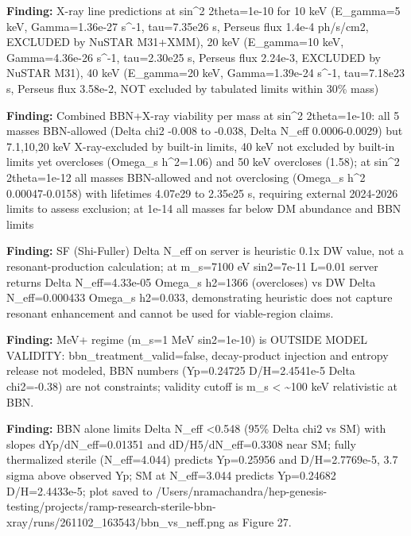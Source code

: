 \documentclass[11pt,a4paper]{article}
\begin{document}
\textbf{Finding:} X-ray line predictions at sin\textasciicircum{}2 2theta=1e-10 for 10 keV (E\_gamma=5 keV, Gamma=1.36e-27 s\textasciicircum{}-1, tau=7.35e26 s, Perseus flux 1.4e-4 ph/s/cm2, EXCLUDED by NuSTAR M31+XMM), 20 keV (E\_gamma=10 keV, Gamma=4.36e-26 s\textasciicircum{}-1, tau=2.30e25 s, Perseus flux 2.24e-3, EXCLUDED by NuSTAR M31), 40 keV (E\_gamma=20 keV, Gamma=1.39e-24 s\textasciicircum{}-1, tau=7.18e23 s, Perseus flux 3.58e-2, NOT excluded by tabulated limits within 30\% mass)

\textbf{Finding:} Combined BBN+X-ray viability per mass at sin\textasciicircum{}2 2theta=1e-10: all 5 masses BBN-allowed (Delta chi2 -0.008 to -0.038, Delta N\_eff 0.0006-0.0029) but 7.1,10,20 keV X-ray-excluded by built-in limits, 40 keV not excluded by built-in limits yet overcloses (Omega\_s h\textasciicircum{}2=1.06) and 50 keV overcloses (1.58); at sin\textasciicircum{}2 2theta=1e-12 all masses BBN-allowed and not overclosing (Omega\_s h\textasciicircum{}2 0.00047-0.0158) with lifetimes 4.07e29 to 2.35e25 s, requiring external 2024-2026 limits to assess exclusion; at 1e-14 all masses far below DM abundance and BBN limits

\textbf{Finding:} SF (Shi-Fuller) Delta N\_eff on server is heuristic 0.1x DW value, not a resonant-production calculation; at m\_s=7100 eV sin2=7e-11 L=0.01 server returns Delta N\_eff=4.33e-05 Omega\_s h2=1366 (overcloses) vs DW Delta N\_eff=0.000433 Omega\_s h2=0.033, demonstrating heuristic does not capture resonant enhancement and cannot be used for viable-region claims.

\textbf{Finding:} MeV+ regime (m\_s=1 MeV sin2=1e-10) is OUTSIDE MODEL VALIDITY: bbn\_treatment\_valid=false, decay-product injection and entropy release not modeled, BBN numbers (Yp=0.24725 D/H=2.4541e-5 Delta chi2=-0.38) are not constraints; validity cutoff is m\_s \textless{} \textasciitilde{}100 keV relativistic at BBN.

\textbf{Finding:} BBN alone limits Delta N\_eff \textless{}0.548 (95\% Delta chi2 vs SM) with slopes dYp/dN\_eff=0.01351 and dD/H5/dN\_eff=0.3308 near SM; fully thermalized sterile (N\_eff=4.044) predicts Yp=0.25956 and D/H=2.7769e-5, 3.7 sigma above observed Yp; SM at N\_eff=3.044 predicts Yp=0.24682 D/H=2.4433e-5; plot saved to /Users/nramachandra/hep-genesis-testing/projects/ramp-research-sterile-bbn-xray/runs/261102\_163543/bbn\_vs\_neff.png as Figure 27.
\end{document}
